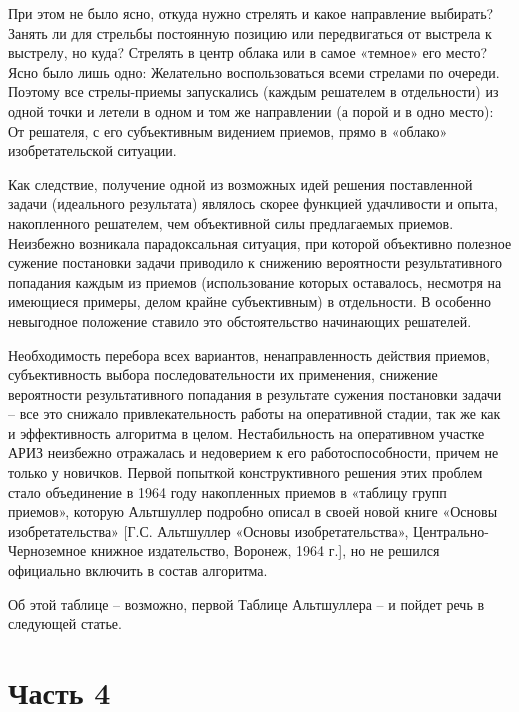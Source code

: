 \documentclass[11pt,a4paper]{article}
\begin{document}
При этом не было ясно, откуда нужно стрелять и какое направление выбирать?
Занять ли для стрельбы постоянную позицию или передвигаться от выстрела к
выстрелу, но куда? Стрелять в центр облака или в самое «темное» его место?
Ясно было лишь одно: Желательно воспользоваться всеми стрелами по
очереди. Поэтому все стрелы-приемы запускались (каждым решателем в
отдельности) из одной точки и летели в одном и том же направлении (а порой и в
одно место): От решателя, с его субъективным видением приемов, прямо в
«облако» изобретательской ситуации.

Как следствие, получение одной из возможных идей решения поставленной задачи
(идеального результата) являлось скорее функцией удачливости и опыта,
накопленного решателем, чем объективной силы предлагаемых приемов. Неизбежно
возникала парадоксальная ситуация, при которой объективно полезное сужение
постановки задачи приводило к снижению вероятности результативного попадания
каждым из приемов (использование которых оставалось, несмотря на имеющиеся
примеры, делом крайне субъективным) в отдельности. В особенно невыгодное
положение ставило это обстоятельство начинающих решателей.

Необходимость перебора всех вариантов, ненаправленность действия приемов,
субъективность выбора последовательности их применения, снижение вероятности
результативного попадания в результате сужения постановки задачи -- все это
снижало привлекательность работы на оперативной стадии, так же как и
эффективность алгоритма в целом. Нестабильность на оперативном участке АРИЗ
неизбежно отражалась и недоверием к его работоспособности, причем не только у
новичков. Первой попыткой конструктивного решения этих проблем стало
объединение в 1964 году накопленных приемов в «таблицу групп приемов», которую
Альтшуллер подробно описал в своей новой книге «Основы изобретательства»
[Г.С. Альтшуллер «Основы изобретательства», Центрально-Черноземное книжное
  издательство, Воронеж, 1964 г.], но не решился официально включить в состав
алгоритма.

Об этой таблице -- возможно, первой Таблице Альтшуллера -- и пойдет речь в
следующей статье.


\section*{Часть 4}
\end{document}
